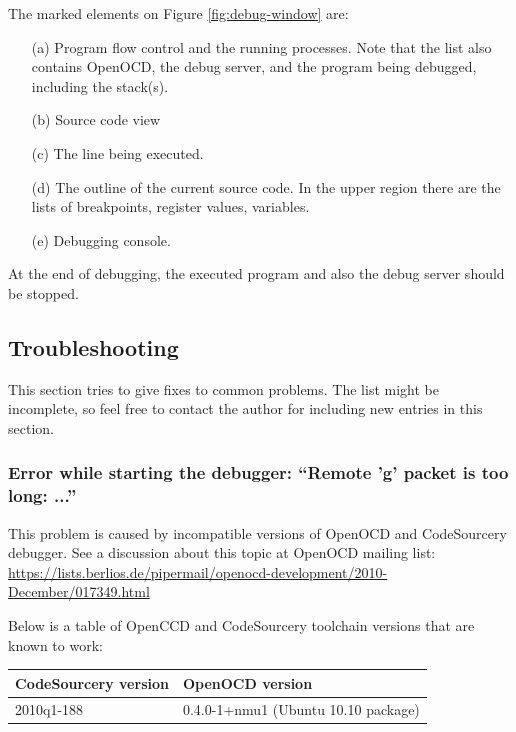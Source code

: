 \documentclass[a4paper, 10pt]{article}
\begin{document}
The marked elements on Figure \ref{fig:debug-window} are:
    \begin{itemize}
    \item[(a)] Program flow control and the running processes.
        Note that the list also contains OpenOCD, the debug server, 
        and the program being debugged, including the stack(s).
    \item[(b)] Source code view
    \item[(c)] The line being executed.
    \item[(d)] The outline of the current source code.
        In the upper region there are the lists of breakpoints, register values,
        variables.
    \item[(e)] Debugging console.
    \end{itemize}

At the end of debugging, the executed program and also the 
debug server should be stopped.

\subsection{Troubleshooting}

This section tries to give fixes to common problems. 
The list might be incomplete, so feel free to contact the author for including 
new entries in this section.

\subsubsection{Error while starting the debugger: ``Remote 'g' packet is too long: ...''}

\label{sect:gdb-problems}
This problem is caused by incompatible versions of OpenOCD and CodeSourcery debugger.
See a discussion about this topic at OpenOCD mailing list:
\url{https://lists.berlios.de/pipermail/openocd-development/2010-December/017349.html}

Below is a table of OpenCCD and CodeSourcery toolchain versions that are known to work:

    \smallskip
    \begin{tabular}{ l | l }
    CodeSourcery version & OpenOCD version \\
    \hline
    2010q1-188          &   0.4.0-1+nmu1 (Ubuntu 10.10 package) \\
    \end{tabular}
    \smallskip
\end{document}
